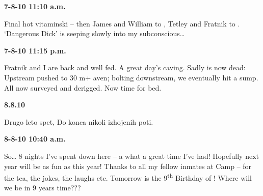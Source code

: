 
\textbf{7-8-10 11:10 a.m.}


Final hot vitaminski -- then James and William to , Tetley and Fratnik to . `Dangerous Dick' is seeping slowly into my subconscious\ldots{}



\textbf{7-8-10 11:15 p.m.}

Fratnik and I are back and well fed. A great day's caving. Sadly  is now dead: Upstream pushed to 30 m+ aven; bolting downstream, we eventually hit a sump. All now surveyed and derigged. Now time for bed.


\textbf{8.8.10}

Drugo leto spet, Do konca nikoli izhojenih poti.



\textbf{8-8-10 10:40 a.m.}

So\ldots{} 8 nights I've spent down here -- a what a great time I've
had! Hopefully next year will be as fun as this year! Thanks to all my
fellow inmates at Camp  -- for the tea, the jokes, the
laughs etc. Tomorrow is the 9\textsuperscript{th} Birthday of ! Where will we be in 9 years time???



